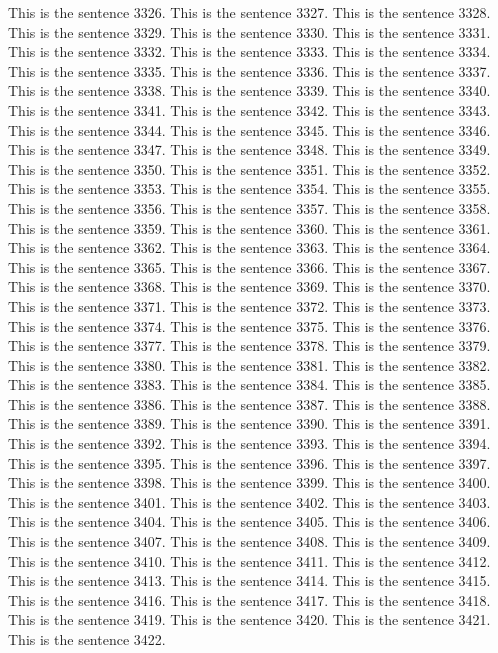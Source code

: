 \documentclass{article}
\begin{document}
This is the sentence 3326.
This is the sentence 3327.
This is the sentence 3328.
This is the sentence 3329.
This is the sentence 3330.
This is the sentence 3331.
This is the sentence 3332.
This is the sentence 3333.
This is the sentence 3334.
This is the sentence 3335.
This is the sentence 3336.
This is the sentence 3337.
This is the sentence 3338.
This is the sentence 3339.
This is the sentence 3340.
This is the sentence 3341.
This is the sentence 3342.
This is the sentence 3343.
This is the sentence 3344.
This is the sentence 3345.
This is the sentence 3346.
This is the sentence 3347.
This is the sentence 3348.
This is the sentence 3349.
This is the sentence 3350.
This is the sentence 3351.
This is the sentence 3352.
This is the sentence 3353.
This is the sentence 3354.
This is the sentence 3355.
This is the sentence 3356.
This is the sentence 3357.
This is the sentence 3358.
This is the sentence 3359.
This is the sentence 3360.
This is the sentence 3361.
This is the sentence 3362.
This is the sentence 3363.
This is the sentence 3364.
This is the sentence 3365.
This is the sentence 3366.
This is the sentence 3367.
This is the sentence 3368.
This is the sentence 3369.
This is the sentence 3370.
This is the sentence 3371.
This is the sentence 3372.
This is the sentence 3373.
This is the sentence 3374.
This is the sentence 3375.
This is the sentence 3376.
This is the sentence 3377.
This is the sentence 3378.
This is the sentence 3379.
This is the sentence 3380.
This is the sentence 3381.
This is the sentence 3382.
This is the sentence 3383.
This is the sentence 3384.
This is the sentence 3385.
This is the sentence 3386.
This is the sentence 3387.
This is the sentence 3388.
This is the sentence 3389.
This is the sentence 3390.
This is the sentence 3391.
This is the sentence 3392.
This is the sentence 3393.
This is the sentence 3394.
This is the sentence 3395.
This is the sentence 3396.
This is the sentence 3397.
This is the sentence 3398.
This is the sentence 3399.
This is the sentence 3400.
This is the sentence 3401.
This is the sentence 3402.
This is the sentence 3403.
This is the sentence 3404.
This is the sentence 3405.
This is the sentence 3406.
This is the sentence 3407.
This is the sentence 3408.
This is the sentence 3409.
This is the sentence 3410.
This is the sentence 3411.
This is the sentence 3412.
This is the sentence 3413.
This is the sentence 3414.
This is the sentence 3415.
This is the sentence 3416.
This is the sentence 3417.
This is the sentence 3418.
This is the sentence 3419.
This is the sentence 3420.
This is the sentence 3421.
This is the sentence 3422.
\end{document}
